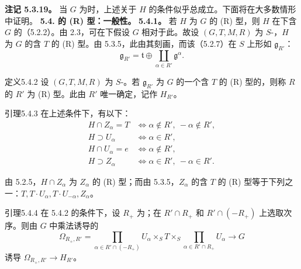 \textbf{注记 5.3.19。} 当 $G$ 为时，上述关于 $H$ 的条件似乎总成立。下面将在大多数情形中证明。
\textbf{5.4. 的 (R) 型：一般性。}
\textbf{5.4.1。} 若 $H$ 为 $G$ 的 (R) 型，则 $H$ 在下含 $G$ 的（5.2.2）。由 2.3，可在下假设 $G$ 相对于此。故设 $(G,T,M,R)$ 为 $S$-，$H$ 为 $G$ 的含 $T$ 的 (R) 型。由 5.3.5，此由其刻画，而该（5.2.7）在 $S$ 上形如 $\mathfrak g_{R'}$：
\[\mathfrak g_{R'}=\mathfrak t\oplus\coprod_{\alpha\in R'}\mathfrak g^\alpha.\]
\begin{SGAresult}{定义}{5.4.2} 设 $(G,T,M,R)$ 为 $S$-。若 $\mathfrak g_{R'}$ 为 $G$ 的一个含 $T$ 的 (R) 型的，则称 $R$ 的 $R'$ 为 (R) 型。此由 $R'$ 唯一确定，记作 $H_{R'}$。\end{SGAresult}
\begin{SGAresult}{引理}{5.4.3} 在上述条件下，有以下：
\[\begin{aligned}
H\cap Z_\alpha=T&\Longleftrightarrow\alpha\notin R',\ -\alpha\notin R',\\
H\supset U_\alpha&\Longleftrightarrow\alpha\in R',\\
H\cap U_\alpha=e&\Longleftrightarrow\alpha\notin R',\\
H\supset Z_\alpha&\Longleftrightarrow\alpha\in R',\ -\alpha\in R'.
\end{aligned}\]
\end{SGAresult}
由 5.2.5，$H\cap Z_\alpha$ 为 $Z_\alpha$ 的 (R) 型；而由 5.3.5，$Z_\alpha$ 的含 $T$ 的 (R) 型等于下列之一：$T,T\cdot U_\alpha,T\cdot U_{-\alpha},Z_\alpha$。
\begin{SGAresult}{引理}{5.4.4} 在 5.4.2 的条件下，设 $R_+$ 为；在 $R'\cap R_+$ 和 $R'\cap(-R_+)$ 上选取次序。则由 $G$ 中乘法诱导的
\[\Omega_{R_+,R'}=\prod_{\alpha\in R'\cap(-R_+)}U_\alpha\mathbin{\times_S}T\mathbin{\times_S}\prod_{\alpha\in R'\cap R_+}U_\alpha\longrightarrow G\]
诱导 $\Omega_{R_+,R'}\to H_{R'}$。
\end{SGAresult}
